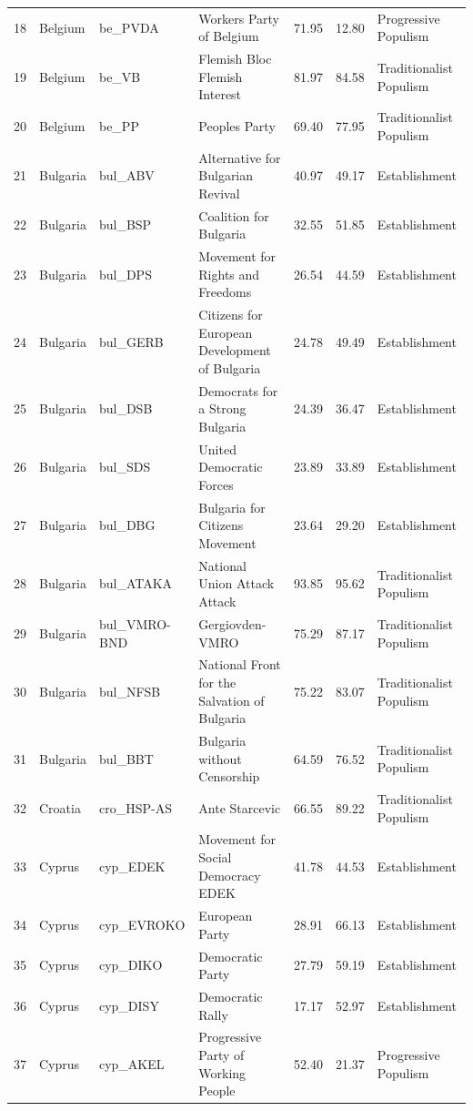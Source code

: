 \begin{landscape}
\begin{longtable}[c]{@{\extracolsep{\fill}}rlllrrl}
  18 & Belgium & be\_PVDA & Workers Party of Belgium & 71.95 & 12.80 & Progressive Populism \\ 
  19 & Belgium & be\_VB & Flemish Bloc Flemish Interest & 81.97 & 84.58 & Traditionalist Populism \\ 
  20 & Belgium & be\_PP & Peoples Party & 69.40 & 77.95 & Traditionalist Populism \\ 
  21 & Bulgaria & bul\_ABV & Alternative for Bulgarian Revival & 40.97 & 49.17 & Establishment \\ 
  22 & Bulgaria & bul\_BSP & Coalition for Bulgaria & 32.55 & 51.85 & Establishment \\ 
  23 & Bulgaria & bul\_DPS & Movement for Rights and Freedoms & 26.54 & 44.59 & Establishment \\ 
  24 & Bulgaria & bul\_GERB & Citizens for European Development of Bulgaria & 24.78 & 49.49 & Establishment \\ 
  25 & Bulgaria & bul\_DSB & Democrats for a Strong Bulgaria & 24.39 & 36.47 & Establishment \\ 
  26 & Bulgaria & bul\_SDS & United Democratic Forces & 23.89 & 33.89 & Establishment \\ 
  27 & Bulgaria & bul\_DBG & Bulgaria for Citizens Movement & 23.64 & 29.20 & Establishment \\ 
  28 & Bulgaria & bul\_ATAKA & National Union Attack Attack & 93.85 & 95.62 & Traditionalist Populism \\ 
  29 & Bulgaria & bul\_VMRO-BND & Gergiovden-VMRO & 75.29 & 87.17 & Traditionalist Populism \\ 
  30 & Bulgaria & bul\_NFSB & National Front for the Salvation of Bulgaria & 75.22 & 83.07 & Traditionalist Populism \\ 
  31 & Bulgaria & bul\_BBT & Bulgaria without Censorship & 64.59 & 76.52 & Traditionalist Populism \\ 
  32 & Croatia & cro\_HSP-AS & Ante Starcevic & 66.55 & 89.22 & Traditionalist Populism \\ 
  33 & Cyprus & cyp\_EDEK & Movement for Social Democracy EDEK & 41.78 & 44.53 & Establishment \\ 
  34 & Cyprus & cyp\_EVROKO & European Party & 28.91 & 66.13 & Establishment \\ 
  35 & Cyprus & cyp\_DIKO & Democratic Party & 27.79 & 59.19 & Establishment \\ 
  36 & Cyprus & cyp\_DISY & Democratic Rally & 17.17 & 52.97 & Establishment \\ 
  37 & Cyprus & cyp\_AKEL & Progressive Party of Working People & 52.40 & 21.37 & Progressive Populism \\ 

\end{longtable}
\end{landscape}
